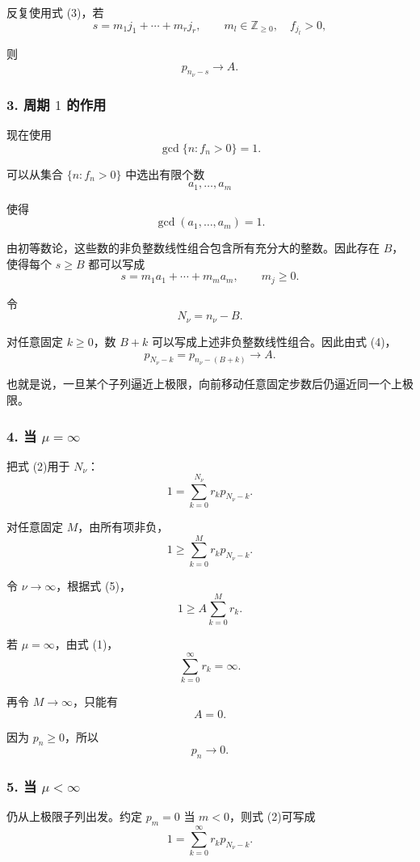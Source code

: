 \documentclass[11pt,a4paper]{ctexart}
\begin{document}
反复使用式 (3)，若
\[
s=m_1j_1+\cdots+m_rj_r,
\qquad
m_l\in\mathbb Z_{\ge0},\quad f_{j_l}>0,
\]

则
\begin{equation}\tag{4}
p_{n_\nu-s}\longrightarrow A.
\end{equation}

\subsubsection*{3. 周期 $1$ 的作用}

现在使用
\[
\gcd\{n:f_n>0\}=1.
\]

可以从集合 $\{n:f_n>0\}$ 中选出有限个数
\[
a_1,\ldots,a_m
\]

使得
\[
\gcd(a_1,\ldots,a_m)=1.
\]

由初等数论，这些数的非负整数线性组合包含所有充分大的整数。因此存在 $B$，使得每个 $s\ge B$ 都可以写成
\[
s=m_1a_1+\cdots+m_ma_m,
\qquad m_j\ge0.
\]

令
\[
N_\nu=n_\nu-B.
\]

对任意固定 $k\ge0$，数 $B+k$ 可以写成上述非负整数线性组合。因此由式 (4)，
\begin{equation}\tag{5}
p_{N_\nu-k}
=p_{n_\nu-(B+k)}
\longrightarrow A.
\end{equation}

也就是说，一旦某个子列逼近上极限，向前移动任意固定步数后仍逼近同一个上极限。

\subsubsection*{4. 当 $\mu=\infty$}

把式 (2)用于 $N_\nu$：
\[
1=\sum_{k=0}^{N_\nu}r_kp_{N_\nu-k}.
\]

对任意固定 $M$，由所有项非负，
\[
1\ge\sum_{k=0}^M r_kp_{N_\nu-k}.
\]

令 $\nu\to\infty$，根据式 (5)，
\[
1\ge A\sum_{k=0}^M r_k.
\]

若 $\mu=\infty$，由式 (1)，
\[
\sum_{k=0}^{\infty}r_k=\infty.
\]

再令 $M\to\infty$，只能有
\[
A=0.
\]

因为 $p_n\ge0$，所以
\[
\boxed{p_n\longrightarrow0}.
\]

\subsubsection*{5. 当 $\mu<\infty$}

仍从上极限子列出发。约定 $p_m=0$ 当 $m<0$，则式 (2)可写成
\[
1=\sum_{k=0}^{\infty}r_kp_{N_\nu-k}.
\]
\end{document}
